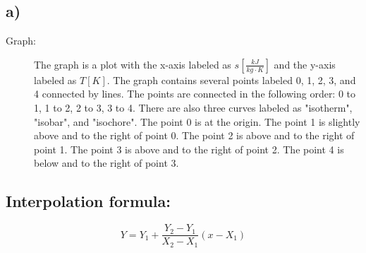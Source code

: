 

\subsection*{a)}

\begin{description}
    \item[Graph:] 
    The graph is a plot with the x-axis labeled as $s \left[ \frac{kJ}{kg \cdot K} \right]$ and the y-axis labeled as $T \left[ K \right]$. The graph contains several points labeled 0, 1, 2, 3, and 4 connected by lines. The points are connected in the following order: 0 to 1, 1 to 2, 2 to 3, 3 to 4. There are also three curves labeled as "isotherm", "isobar", and "isochore". The point 0 is at the origin. The point 1 is slightly above and to the right of point 0. The point 2 is above and to the right of point 1. The point 3 is above and to the right of point 2. The point 4 is below and to the right of point 3.
\end{description}

\subsection*{Interpolation formula:}

\[
Y = Y_1 + \frac{Y_2 - Y_1}{X_2 - X_1} (x - X_1)
\]